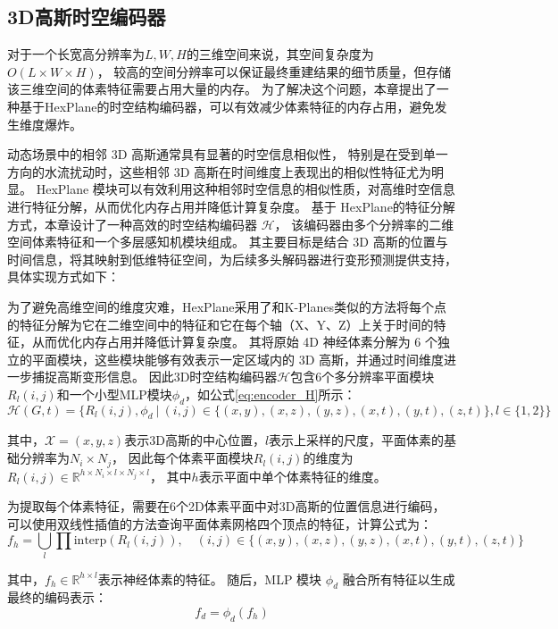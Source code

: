 \subsection{3D高斯时空编码器}
对于一个长宽高分辨率为$L, W, H$的三维空间来说，其空间复杂度为$O(L \times W \times H)$，
较高的空间分辨率可以保证最终重建结果的细节质量，但存储该三维空间的体素特征需要占用大量的内存。
为了解决这个问题，本章提出了一种基于HexPlane\cite{hex_plane}的时空结构编码器，可以有效减少体素特征的内存占用，避免发生维度爆炸。

动态场景中的相邻 3D 高斯通常具有显著的时空信息相似性，
特别是在受到单一方向的水流扰动时，这些相邻 3D 高斯在时间维度上表现出的相似性特征尤为明显。
HexPlane 模块可以有效利用这种相邻时空信息的相似性质，对高维时空信息进行特征分解，从而优化内存占用并降低计算复杂度。
基于 HexPlane的特征分解方式，本章设计了一种高效的时空结构编码器 $\mathcal{H}$，
该编码器由多个分辨率的二维空间体素特征和一个多层感知机模块组成。
其主要目标是结合 3D 高斯的位置与时间信息，将其映射到低维特征空间，为后续多头解码器进行变形预测提供支持，具体实现方式如下：

为了避免高维空间的维度灾难，HexPlane采用了和K-Planes\cite{k-planes}类似的方法将每个点的特征分解为它在二维空间中的特征和它在每个轴（X、Y、Z）上关于时间的特征，从而优化内存占用并降低计算复杂度。
其将原始 4D 神经体素分解为 6 个独立的平面模块，这些模块能够有效表示一定区域内的 3D 高斯，并通过时间维度进一步捕捉高斯变形信息。
因此3D时空结构编码器$\mathcal{H}$包含6个多分辨率平面模块$R_l(i,j)$和一个小型MLP模块$\phi_d$，如公式\ref{eq:encoder_H}所示：
\begin{equation}
\label{eq:encoder_H}
\mathcal{H}(G, t) = \{ R_l(i,j), \phi_d \ | \ (i,j) \in \{(x,y), (x,z), (y,z), (x,t), (y,t), (z,t)\}, l \in \{1, 2\} \}
\end{equation}

其中，$\mathcal{X} = (x, y, z)$表示3D高斯的中心位置，$l$表示上采样的尺度，平面体素的基础分辨率为$N_i \times N_j$，
因此每个体素平面模块$R_l(i,j)$的维度为$R_l(i,j) \in \mathbb{R}^{h \times N_i \times l \times N_j \times l}$，
其中$h$表示平面中单个体素特征的维度。

为提取每个体素特征，需要在6个2D体素平面中对3D高斯的位置信息进行编码，可以使用双线性插值的方法查询平面体素网格四个顶点的特征，计算公式为：
\begin{equation}
f_h = \bigcup_l \prod \text{interp}(R_l(i,j)), \quad (i,j) \in \{(x,y),(x,z),(y,z),(x,t),(y,t),(z,t)\}
\end{equation}

其中，$f_h \in \mathbb{R}^{h \times l}$表示神经体素的特征。
随后，MLP 模块 $\phi_d$ 融合所有特征以生成最终的编码表示：
\begin{equation}
f_d = \phi_d(f_h)
\end{equation}  

